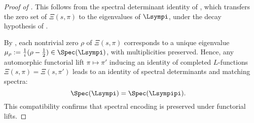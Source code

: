 \begin{proof}[Proof of ]
This follows from the spectral determinant identity of ,
which transfers the zero set of \( \Xi(s, \pi) \) to the eigenvalues of \( \Lsympi \), under the decay hypothesis of .

By , each nontrivial zero \( \rho \) of \( \Xi(s, \pi) \) corresponds to a unique eigenvalue \( \mu_\rho := \frac{1}{i}(\rho - \tfrac{1}{2}) \in \Spec(\Lsympi) \), with multiplicities preserved. Hence, any automorphic functorial lift \( \pi \mapsto \pi' \) inducing an identity of completed \( L \)-functions \( \Xi(s, \pi) = \Xi(s, \pi') \) leads to an identity of spectral determinants and matching spectra:
\[
\Spec(\Lsympi) = \Spec(\Lsympipi).
\]
This compatibility confirms that spectral encoding is preserved under functorial lifts.
\end{proof}
